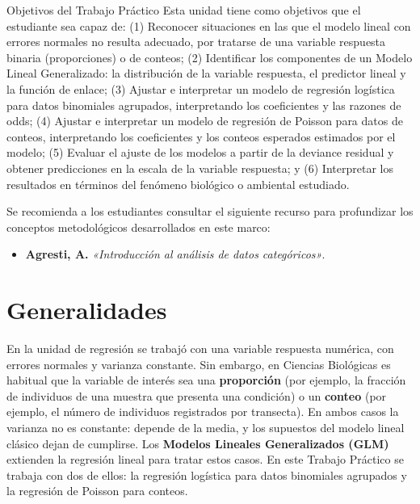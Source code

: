 \documentclass[
  spanish,
  letterpaper,
  DIV=11,
  numbers=noendperiod]{scrreprt}
\providecommand{\tightlist}{%
  \setlength{\itemsep}{0pt}\setlength{\parskip}{0pt}}
\begin{document}
Objetivos del Trabajo Práctico Esta unidad tiene como objetivos que el
estudiante sea capaz de: (1) Reconocer situaciones en las que el modelo
lineal con errores normales no resulta adecuado, por tratarse de una
variable respuesta binaria (proporciones) o de conteos; (2) Identificar
los componentes de un Modelo Lineal Generalizado: la distribución de la
variable respuesta, el predictor lineal y la función de enlace; (3)
Ajustar e interpretar un modelo de regresión logística para datos
binomiales agrupados, interpretando los coeficientes y las razones de
odds; (4) Ajustar e interpretar un modelo de regresión de Poisson para
datos de conteos, interpretando los coeficientes y los conteos esperados
estimados por el modelo; (5) Evaluar el ajuste de los modelos a partir
de la deviance residual y obtener predicciones en la escala de la
variable respuesta; y (6) Interpretar los resultados en términos del
fenómeno biológico o ambiental estudiado.

\begin{tcolorbox}[enhanced jigsaw, arc=.35mm, bottomrule=.15mm, bottomtitle=1mm, breakable, colback=white, colbacktitle=quarto-callout-important-color!10!white, colframe=quarto-callout-important-color-frame, coltitle=black, left=2mm, leftrule=.75mm, opacityback=0, opacitybacktitle=0.6, rightrule=.15mm, title=\textcolor{quarto-callout-important-color}{\faExclamation}\hspace{0.5em}{Lectura Sugerida para el Trabajo Práctico}, titlerule=0mm, toprule=.15mm, toptitle=1mm]

Se recomienda a los estudiantes consultar el siguiente recurso para
profundizar los conceptos metodológicos desarrollados en este marco:

\begin{itemize}
\tightlist
\item
  \textbf{Agresti, A.} \emph{«Introducción al análisis de datos
  categóricos»}.
\end{itemize}

\end{tcolorbox}

\section{Generalidades}\label{generalidades-8}

En la unidad de regresión se trabajó con una variable respuesta
numérica, con errores normales y varianza constante. Sin embargo, en
Ciencias Biológicas es habitual que la variable de interés sea una
\textbf{proporción} (por ejemplo, la fracción de individuos de una
muestra que presenta una condición) o un \textbf{conteo} (por ejemplo,
el número de individuos registrados por transecta). En ambos casos la
varianza no es constante: depende de la media, y los supuestos del
modelo lineal clásico dejan de cumplirse. Los \textbf{Modelos Lineales
Generalizados (GLM)} extienden la regresión lineal para tratar estos
casos. En este Trabajo Práctico se trabaja con dos de ellos: la
regresión logística para datos binomiales agrupados y la regresión de
Poisson para conteos.
\end{document}
